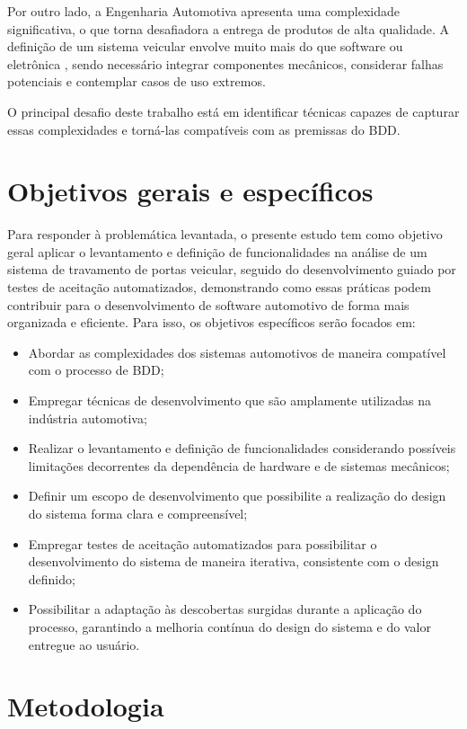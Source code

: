 Por outro lado, a Engenharia Automotiva apresenta uma complexidade significativa, o que torna desafiadora a entrega de produtos de alta qualidade. A definição de 
um sistema veicular envolve muito mais do que software ou eletrônica \cite{bosch2022handbook}, sendo necessário integrar componentes mecânicos, considerar falhas 
potenciais e contemplar casos de uso extremos.

O principal desafio deste trabalho está em identificar técnicas capazes de capturar essas complexidades e torná-las compatíveis com as premissas do BDD.

\section{Objetivos gerais e específicos}

Para responder à problemática levantada, o presente estudo tem como objetivo geral aplicar o levantamento e definição de funcionalidades na análise de um sistema de 
travamento de portas veicular, seguido do desenvolvimento guiado por testes de aceitação automatizados, demonstrando como essas práticas podem contribuir para o 
desenvolvimento de software automotivo de forma mais organizada e eficiente.
Para isso, os objetivos específicos serão focados em:
\begin{itemize}
	\item Abordar as complexidades dos sistemas automotivos de maneira compatível com o processo de BDD;
    \item Empregar técnicas de desenvolvimento que são amplamente utilizadas na indústria automotiva;
    \item Realizar o levantamento e definição de funcionalidades considerando possíveis limitações decorrentes da dependência de hardware e de sistemas mecânicos;
    \item Definir um escopo de desenvolvimento que possibilite a realização do design do sistema forma clara e compreensível;
    \item Empregar testes de aceitação automatizados para possibilitar o desenvolvimento do sistema de maneira iterativa, consistente com o design definido;
    \item Possibilitar a adaptação às descobertas surgidas durante a aplicação do processo, garantindo a melhoria contínua do design do sistema e do valor entregue ao usuário.
\end{itemize}

\section{Metodologia}

